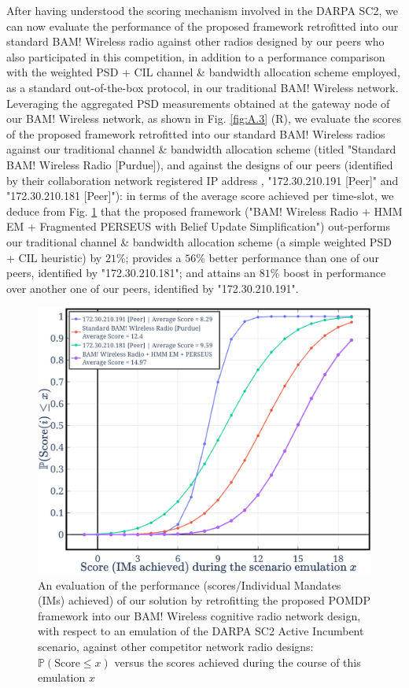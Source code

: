 \documentclass[12pt, draftcls, onecolumn]{IEEEtran}
\begin{document}
After having understood the scoring mechanism involved in the DARPA SC2, we can now evaluate the performance of the proposed framework retrofitted into our standard BAM! Wireless radio \cite{BAM} against other radios designed by our peers who also participated in this competition, in addition to a performance comparison with the weighted PSD + CIL \cite{DARPA:CIL} channel \& bandwidth allocation scheme employed, as a standard out-of-the-box protocol, in our traditional BAM! Wireless network. Leveraging the aggregated PSD measurements obtained at the gateway node of our BAM! Wireless network, as shown in Fig. \ref{fig:A.3} (R), we evaluate the scores of the proposed framework retrofitted into our standard BAM! Wireless radios against our traditional channel \& bandwidth allocation scheme (titled "Standard BAM! Wireless Radio [Purdue]), and against the designs of our peers (identified by their collaboration network registered IP address \cite{DARPA:CIL}, "172.30.210.191 [Peer]" and "172.30.210.181 [Peer]"): in terms of the average score achieved per time-slot, we deduce from Fig. \ref{fig: Y. 4} that the proposed framework ("BAM! Wireless Radio + HMM EM + Fragmented PERSEUS with Belief Update Simplification") out-performs our traditional channel \& bandwidth allocation scheme (a simple weighted PSD + CIL heuristic) by $21$\%; provides a $56$\% better performance than one of our peers, identified by "172.30.210.181"; and attains an $81$\% boost in performance over another one of our peers, identified by "172.30.210.191".
\begin{figure} [t]
    \centerline{
    \includegraphics[width = 1.0\linewidth]{figures/Minerva_DARPA_SC2_Performance.png}}
    \vspace{-6mm}
    \caption{An evaluation of the performance (scores/Individual Mandates (IMs) achieved) of our solution by retrofitting the proposed POMDP framework into our BAM! Wireless cognitive radio network design, with respect to an emulation of the DARPA SC2 Active Incumbent scenario, against other competitor network radio designs: $\mathbb{P}(\text{Score}{\leq}x)$ versus the scores achieved during the course of this emulation $x$}
    \vspace{-7mm}
    \label{fig: Y. 4}
\end{figure}
\end{document}
